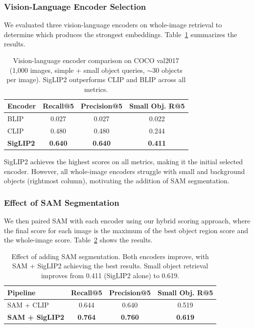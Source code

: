 \subsubsection{Vision-Language Encoder Selection}

We evaluated three vision-language encoders on whole-image retrieval to determine which produces the strongest embeddings. Table~\ref{tab:encoder-selection} summarizes the results.

\begin{table}[H]
    \centering
    \begin{tabular}{lccc}
        \toprule
        \textbf{Encoder} & \textbf{Recall@5} & \textbf{Precision@5} & \textbf{Small Obj. R@5} \\
        \midrule
        BLIP \cite{li2019blip} & 0.027 & 0.027 & 0.022 \\
        CLIP \cite{radford2021learning} & 0.480 & 0.480 & 0.244 \\
        \midrule
        \textbf{SigLIP2} \cite{zhai2025siglip2} & \textbf{0.640} & \textbf{0.640} & \textbf{0.411} \\
        \bottomrule
    \end{tabular}
    \caption{Vision-language encoder comparison on COCO val2017 (1,000 images, simple + small object queries, $\sim$30 objects per image). SigLIP2 outperforms CLIP and BLIP across all metrics.}
    \label{tab:encoder-selection}
\end{table}

SigLIP2 achieves the highest scores on all metrics, making it the initial selected encoder. However, all whole-image encoders struggle with small and background objects (rightmost column), motivating the addition of SAM segmentation.

\subsubsection{Effect of SAM Segmentation}

We then paired SAM with each encoder using our hybrid scoring approach, where the final score for each image is the maximum of the best object region score and the whole-image score. Table~\ref{tab:sam-effect} shows the results.

\begin{table}[H]
    \centering
    \begin{tabular}{lccc}
        \toprule
        \textbf{Pipeline} & \textbf{Recall@5} & \textbf{Precision@5} & \textbf{Small Obj. R@5} \\
        \midrule
        SAM + CLIP & 0.644 & 0.640 & 0.519 \\
        \midrule
        \textbf{SAM + SigLIP2} & \textbf{0.764} & \textbf{0.760} & \textbf{0.619} \\
        \bottomrule
    \end{tabular}
    \caption{Effect of adding SAM segmentation. Both encoders improve, with SAM + SigLIP2 achieving the best results. Small object retrieval improves from 0.411 (SigLIP2 alone) to 0.619.}
    \label{tab:sam-effect}
\end{table}

